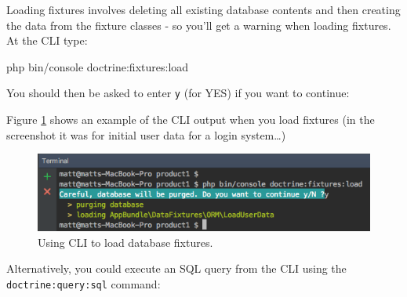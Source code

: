 \documentclass[a4paperpaper,openright]{book}
\newenvironment{Shaded}{}{}
\newcommand{\ExtensionTok}[1]{#1}
\newcommand{\NormalTok}[1]{#1}
\newcommand{\OperatorTok}[1]{\textcolor[rgb]{0.40,0.40,0.40}{#1}}
\begin{document}
Loading fixtures involves deleting all existing database contents and
then creating the data from the fixture classes - so you'll get a
warning when loading fixtures. At the CLI type:

\begin{Shaded}
\begin{Highlighting}[]
    \ExtensionTok{php}\NormalTok{ bin/console doctrine:fixtures:load}
\end{Highlighting}
\end{Shaded}

You should then be asked to enter \texttt{y} (for YES) if you want to
continue:

\begin{Shaded}
\end{Shaded}

Figure \ref{load_fixtures} shows an example of the CLI output when you
load fixtures (in the screenshot it was for initial user data for a
login system\ldots{})

\begin{figure}
\centering
\includegraphics{./tex2pdf.-8aed53dcd332a606/037fd755ae5f5ab98381734496109ca96f310c3a.png}
\caption{Using CLI to load database fixtures. \label{load_fixtures}}
\end{figure}

Alternatively, you could execute an SQL query from the CLI using the
\texttt{doctrine:query:sql} command:
\end{document}
